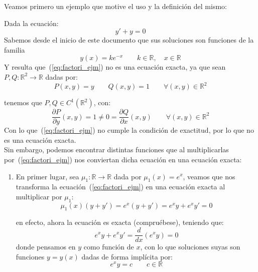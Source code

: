 Veamos primero un ejemplo que motive el uso y la definición del mismo:
\begin{ejemplo}
    Dada la ecuación:
    \begin{equation}\label{eq:factori_ejm}
        y' + y = 0
    \end{equation}
    Sabemos desde el inicio de este documento que sus soluciones son funciones de la familia
    \begin{equation*}
        y(x) = ke^{-x} \qquad k\in \mathbb{R}, \quad x\in \mathbb{R}
    \end{equation*}
    Y resulta que~(\ref{eq:factori_ejm}) no es una ecuación exacta, ya que sean $P,Q:\mathbb{R}^2\rightarrow\mathbb{R}$ dadas por:
    \begin{equation*}
        P(x,y) = y \qquad Q(x,y) = 1 \qquad \forall (x,y)\in \mathbb{R}^2
    \end{equation*}

    tenemos que $P,Q\in C^1(\mathbb{R}^2)$, con:
    \begin{equation*}
        \dfrac{\partial P}{\partial y}(x,y) = 1 \neq 0 = \dfrac{\partial Q}{\partial x}(x,y) \qquad \forall (x,y)\in \mathbb{R}^2
    \end{equation*}
    Con lo que~(\ref{eq:factori_ejm}) no cumple la condición de exactitud, por lo que no es una ecuación exacta.\\
    Sin embargo, podemos encontrar distintas funciones que al multiplicarlas por~(\ref{eq:factori_ejm}) nos conviertan dicha ecuación en una ecuación exacta:
    \begin{enumerate}
        \item En primer lugar, sea $\mu_1:\mathbb{R}\rightarrow\mathbb{R}$ dada por $\mu_1(x)=e^x$, veamos que nos transforma la ecuación~(\ref{eq:factori_ejm}) en una ecuación exacta al multiplicar por $\mu_1$:
            \begin{equation*}
                \mu_1(x)(y+y') = e^x(y+y') = e^{x}y + e^{x}y' = 0
            \end{equation*}

            en efecto, ahora la ecuación es exacta (compruébese), teniendo que:
            \begin{equation*}
                e^{x}y + e^{x}y' = \dfrac{d}{dx}(e^x y) = 0
            \end{equation*}
            donde pensamos en $y$ como función de $x$, con lo que soluciones suyas son funciones $y=y(x)$ dadas de forma implícita por:
            \begin{equation*}
                e^x y = c \qquad c\in \mathbb{R}
            \end{equation*}


\end{enumerate}
\end{ejemplo}
